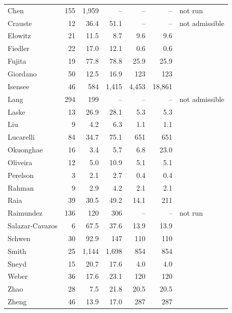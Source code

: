 \begin{longtable}{@{}lrrrrrl@{}}
Chen & 155 & 1,959 & -- & -- & -- & not run \\
Crauste & 12 & 36.4 & 51.1 & -- & -- & not admissible \\
Elowitz & 21 & 11.5 & 8.7 & 9.6 & 9.6 &  \\
Fiedler & 22 & 17.0 & 12.1 & 0.6 & 0.6 &  \\
Fujita & 19 & 77.8 & 78.8 & 25.9 & 25.9 &  \\
Giordano & 50 & 12.5 & 16.9 & 123 & 123 &  \\
Isensee & 46 & 584 & 1,415 & 4,453 & 18,861 &  \\
Lang & 294 & 199 & -- & -- & -- & not admissible \\
Laske & 13 & 26.9 & 28.1 & 5.3 & 5.3 &  \\
Liu & 9 & 4.2 & 6.3 & 1.1 & 1.1 &  \\
Lucarelli & 84 & 34.7 & 75.1 & 651 & 651 &  \\
Okuonghae & 16 & 3.4 & 5.7 & 6.8 & 23.0 &  \\
Oliveira & 12 & 5.0 & 10.9 & 5.1 & 5.1 &  \\
Perelson & 3 & 2.1 & 2.7 & 0.4 & 0.4 &  \\
Rahman & 9 & 2.9 & 4.2 & 2.1 & 2.1 &  \\
Raia & 39 & 30.5 & 49.2 & 14.1 & 211 &  \\
Raimundez & 136 & 120 & 306 & -- & -- & not run \\
Salazar-Cavazos & 6 & 67.5 & 37.6 & 13.9 & 13.9 &  \\
Schwen & 30 & 92.9 & 147 & 110 & 110 &  \\
Smith & 25 & 1,144 & 1,698 & 854 & 854 &  \\
Sneyd & 15 & 20.7 & 17.6 & 4.0 & 4.0 &  \\
Weber & 36 & 17.6 & 23.1 & 120 & 120 &  \\
Zhao & 28 & 7.5 & 21.8 & 20.5 & 20.5 &  \\
Zheng & 46 & 13.9 & 17.0 & 287 & 287 &  \\
\bottomrule
\end{longtable}
